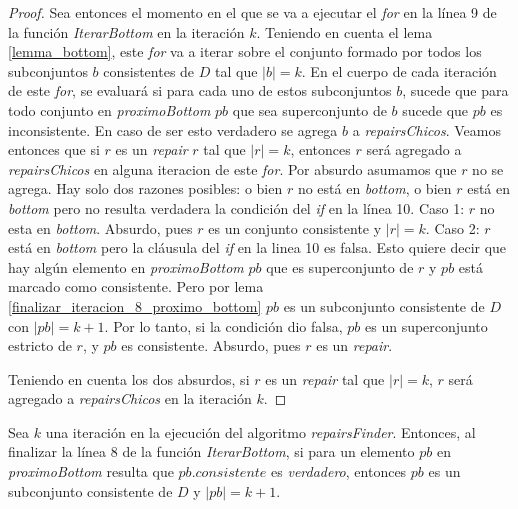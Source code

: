 \documentclass[11pt,a4paper,twoside]{tesis}
\begin{document}
\begin{proof}
Sea entonces el momento en el que se va a ejecutar el \textit{for} en la línea 9 de la función \textit{IterarBottom} en la iteración $k$. Teniendo en cuenta el lema \ref{lemma_bottom}, este \textit{for} va a iterar sobre el conjunto formado por todos los subconjuntos $b$ consistentes de $D$ tal que $|b| = k$.  En el cuerpo de cada iteración de este \textit{for}, se evaluará si para cada uno de estos subconjuntos $b$, sucede que para todo conjunto en \textit{proximoBottom} $pb$ que sea superconjunto de $b$ sucede que $pb$ es inconsistente. En caso de ser esto verdadero se agrega $b$ a \textit{repairsChicos}. Veamos entonces que si $r$ es un \textit{repair} $r$ tal que $|r| = k$, entonces $r$ será  agregado a \textit{repairsChicos} en alguna iteracion de este \textit{for}.
Por absurdo asumamos que $r$ no se agrega. Hay solo dos razones posibles: o bien $r$ no está en \textit{bottom}, o bien $r$ está en \textit{bottom} pero no resulta verdadera la condición del \textit{if} en la línea 10.
Caso 1: $r$ no esta en \textit{bottom}. Absurdo, pues $r$ es un conjunto consistente y $|r| = k$.
Caso 2: $r$ está en \textit{bottom} pero la cláusula del \textit{if} en la linea 10 es falsa. Esto quiere decir que hay algún elemento en \textit{proximoBottom} $pb$ que es superconjunto de $r$ y $pb$ está marcado como consistente. Pero por lema \ref{finalizar_iteracion_8_proximo_bottom} $pb$ es un subconjunto consistente de $D$ con $|pb| = k + 1$. Por lo tanto, si la condición dio falsa, $pb$ es un superconjunto estricto de $r$, y $pb$ es consistente. Absurdo, pues $r$ es un \textit{repair}.

Teniendo en cuenta los dos absurdos, si $r$ es un \textit{repair} tal que $|r| = k$, $r$ será agregado a \textit{repairsChicos} en la iteración $k$. 
\end{proof}

\begin{lemma}\label{finalizar_iteracion_8_proximo_bottom}
Sea $k$ una iteración en la ejecución del algoritmo \textit{repairsFinder}. Entonces, al finalizar la línea 8 de la función \textit{IterarBottom}, si para un elemento $pb$ en \textit{proximoBottom} resulta que $pb.consistente$ es \textit{verdadero}, entonces $pb$ es un subconjunto consistente de $D$ y $|pb| = k +1$.
\end{lemma}
\end{document}
